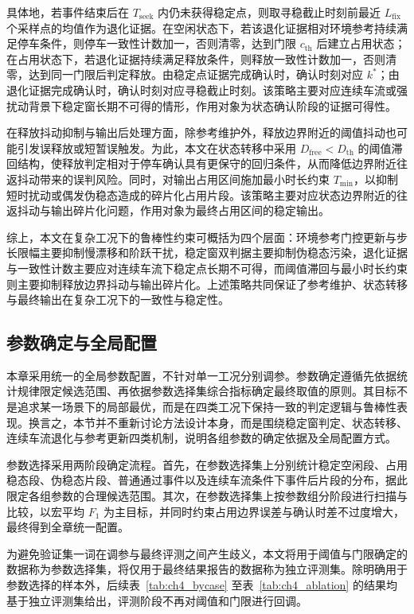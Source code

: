 \documentclass{xdupgthesis}
\begin{document}
具体地，若事件结束后在 $T_{\mathrm{seek}}$ 内仍未获得稳定点，则取寻稳截止时刻前最近 $L_{\mathrm{fix}}$ 个采样点的均值作为退化证据。在空闲状态下，若该退化证据相对环境参考持续满足停车条件，则停车一致性计数加一，否则清零，达到门限 $c_{\mathrm{th}}$ 后建立占用状态；在占用状态下，若退化证据持续满足释放条件，则释放一致性计数加一，否则清零，达到同一门限后判定释放。由稳定点证据完成确认时，确认时刻对应 $k^\ast$；由退化证据完成确认时，确认时刻对应寻稳截止时刻。该策略主要对应连续车流或强扰动背景下稳定窗长期不可得的情形，作用对象为状态确认阶段的证据可得性。

在释放抖动抑制与输出后处理方面，除参考维护外，释放边界附近的阈值抖动也可能引发误释放或短暂误触发。为此，本文在状态转移中采用 $D_{\mathrm{free}}<D_{\mathrm{th}}$ 的阈值滞回结构，使释放判定相对于停车确认具有更保守的回归条件，从而降低边界附近往返抖动带来的误判风险。同时，对输出占用区间施加最小时长约束 $T_{\min}$，以抑制短时扰动或偶发伪稳态造成的碎片化占用片段。该策略主要对应状态边界附近的往返抖动与输出碎片化问题，作用对象为最终占用区间的稳定输出。

综上，本文在复杂工况下的鲁棒性约束可概括为四个层面：环境参考门控更新与步长限幅主要抑制慢漂移和阶跃干扰，稳定窗双判据主要抑制伪稳态污染，退化证据与一致性计数主要应对连续车流下稳定点长期不可得，而阈值滞回与最小时长约束则主要抑制释放边界抖动与输出碎片化。上述策略共同保证了参考维护、状态转移与最终输出在复杂工况下的一致性与稳定性。

\subsection{参数确定与全局配置}
\label{subsec:ch4_paramset}

本章采用统一的全局参数配置，不针对单一工况分别调参。参数确定遵循先依据统计规律限定候选范围、再依据参数选择集综合指标确定最终取值的原则。其目标不是追求某一场景下的局部最优，而是在四类工况下保持一致的判定逻辑与鲁棒性表现。换言之，本节并不重新讨论方法设计本身，而是围绕稳定窗判定、状态转移、连续车流退化与参考更新四类机制，说明各组参数的确定依据及全局配置方式。

参数选择采用两阶段确定流程。首先，在参数选择集上分别统计稳定空闲段、占用稳态段、伪稳态片段、普通通过事件以及连续车流条件下事件后片段的分布，据此限定各组参数的合理候选范围。其次，在参数选择集上按参数组分阶段进行扫描与比较，以宏平均 $F_1$ 为主目标，并同时约束占用边界误差与确认时差不过度增大，最终得到全章统一配置。

为避免验证集一词在调参与最终评测之间产生歧义，本文将用于阈值与门限确定的数据称为参数选择集，将仅用于最终结果报告的数据称为独立评测集。除明确用于参数选择的样本外，后续表~\ref{tab:ch4_bycase} 至表~\ref{tab:ch4_ablation} 的结果均基于独立评测集给出，评测阶段不再对阈值和门限进行回调。
\end{document}
